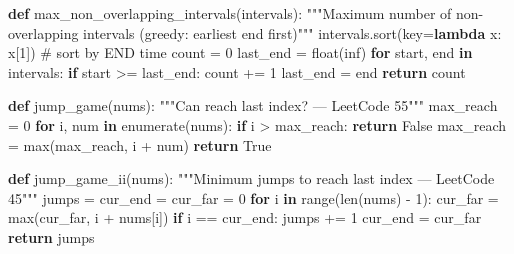 \documentclass[11pt]{article}
\newenvironment{Shaded}{\begin{snugshade}}{\end{snugshade}}
\newcommand{\BuiltInTok}[1]{\textcolor[rgb]{0.50,0.55,0.55}{#1}}
\newcommand{\CommentTok}[1]{\textcolor[rgb]{0.48,0.49,0.49}{#1}}
\newcommand{\ControlFlowTok}[1]{\textcolor[rgb]{0.99,0.74,0.29}{\textbf{#1}}}
\newcommand{\DecValTok}[1]{\textcolor[rgb]{0.96,0.45,0.00}{#1}}
\newcommand{\KeywordTok}[1]{\textcolor[rgb]{0.81,0.81,0.76}{\textbf{#1}}}
\newcommand{\NormalTok}[1]{\textcolor[rgb]{0.81,0.81,0.76}{#1}}
\newcommand{\OperatorTok}[1]{\textcolor[rgb]{0.81,0.81,0.76}{#1}}
\newcommand{\RegionMarkerTok}[1]{\textcolor[rgb]{0.16,0.50,0.73}{\colorbox[rgb]{0.08,0.19,0.26}{#1}}}
\newcommand{\StringTok}[1]{\textcolor[rgb]{0.96,0.31,0.31}{#1}}
\newcommand{\VariableTok}[1]{\textcolor[rgb]{0.15,0.68,0.68}{#1}}
\begin{document}
\begin{Shaded}
\begin{Highlighting}[]
\KeywordTok{def}\NormalTok{ max\_non\_overlapping\_intervals(intervals):}
    \CommentTok{"""Maximum number of non{-}overlapping intervals (greedy: earliest end first)"""}
\NormalTok{    intervals.sort(key}\OperatorTok{=}\KeywordTok{lambda}\NormalTok{ x: x[}\DecValTok{1}\NormalTok{])   }\CommentTok{\# sort by }\RegionMarkerTok{END}\CommentTok{ time}
\NormalTok{    count }\OperatorTok{=} \DecValTok{0}
\NormalTok{    last\_end }\OperatorTok{=} \BuiltInTok{float}\NormalTok{(}\StringTok{\textquotesingle{}{-}inf\textquotesingle{}}\NormalTok{)}
    \ControlFlowTok{for}\NormalTok{ start, end }\KeywordTok{in}\NormalTok{ intervals:}
        \ControlFlowTok{if}\NormalTok{ start }\OperatorTok{\textgreater{}=}\NormalTok{ last\_end:}
\NormalTok{            count }\OperatorTok{+=} \DecValTok{1}
\NormalTok{            last\_end }\OperatorTok{=}\NormalTok{ end}
    \ControlFlowTok{return}\NormalTok{ count}

\KeywordTok{def}\NormalTok{ jump\_game(nums):}
    \CommentTok{"""Can reach last index? — LeetCode 55"""}
\NormalTok{    max\_reach }\OperatorTok{=} \DecValTok{0}
    \ControlFlowTok{for}\NormalTok{ i, num }\KeywordTok{in} \BuiltInTok{enumerate}\NormalTok{(nums):}
        \ControlFlowTok{if}\NormalTok{ i }\OperatorTok{\textgreater{}}\NormalTok{ max\_reach:}
            \ControlFlowTok{return} \VariableTok{False}
\NormalTok{        max\_reach }\OperatorTok{=} \BuiltInTok{max}\NormalTok{(max\_reach, i }\OperatorTok{+}\NormalTok{ num)}
    \ControlFlowTok{return} \VariableTok{True}

\KeywordTok{def}\NormalTok{ jump\_game\_ii(nums):}
    \CommentTok{"""Minimum jumps to reach last index — LeetCode 45"""}
\NormalTok{    jumps }\OperatorTok{=}\NormalTok{ cur\_end }\OperatorTok{=}\NormalTok{ cur\_far }\OperatorTok{=} \DecValTok{0}
    \ControlFlowTok{for}\NormalTok{ i }\KeywordTok{in} \BuiltInTok{range}\NormalTok{(}\BuiltInTok{len}\NormalTok{(nums) }\OperatorTok{{-}} \DecValTok{1}\NormalTok{):}
\NormalTok{        cur\_far }\OperatorTok{=} \BuiltInTok{max}\NormalTok{(cur\_far, i }\OperatorTok{+}\NormalTok{ nums[i])}
        \ControlFlowTok{if}\NormalTok{ i }\OperatorTok{==}\NormalTok{ cur\_end:}
\NormalTok{            jumps }\OperatorTok{+=} \DecValTok{1}
\NormalTok{            cur\_end }\OperatorTok{=}\NormalTok{ cur\_far}
    \ControlFlowTok{return}\NormalTok{ jumps}
\end{Highlighting}
\end{Shaded}
\end{document}
